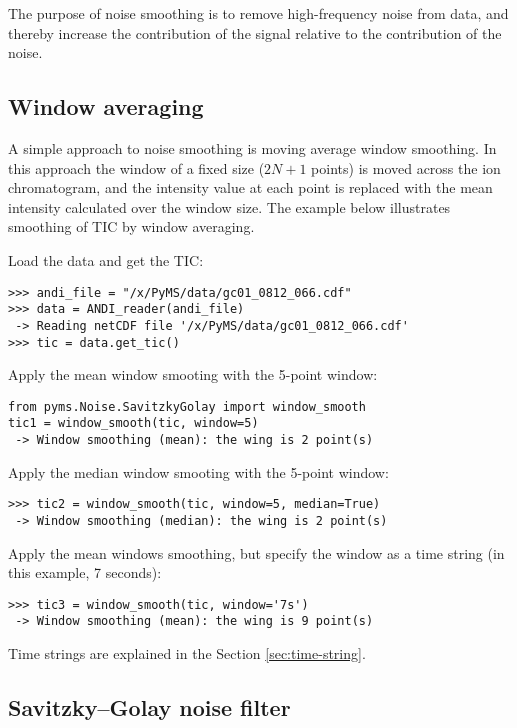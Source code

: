The purpose of noise smoothing is to remove high-frequency noise from
data, and thereby increase the contribution of the signal relative to
the contribution of the noise.

\subsection{Window averaging}


A simple approach to noise smoothing is moving average window smoothing.
In this approach the window of a fixed size ($2N+1$ points) is moved
across the ion chromatogram, and the intensity value at each point is
replaced with the mean intensity calculated over the window size.
The example below illustrates smoothing of TIC by window averaging.

Load the data and get the TIC:

\begin{verbatim}
>>> andi_file = "/x/PyMS/data/gc01_0812_066.cdf"
>>> data = ANDI_reader(andi_file)
 -> Reading netCDF file '/x/PyMS/data/gc01_0812_066.cdf'
>>> tic = data.get_tic()
\end{verbatim}

Apply the mean window smooting with the 5-point window:

\begin{verbatim}
from pyms.Noise.SavitzkyGolay import window_smooth
tic1 = window_smooth(tic, window=5)
 -> Window smoothing (mean): the wing is 2 point(s)
\end{verbatim}

Apply the median window smooting with the 5-point window:

\begin{verbatim}
>>> tic2 = window_smooth(tic, window=5, median=True)
 -> Window smoothing (median): the wing is 2 point(s)
\end{verbatim}

Apply the mean windows smoothing, but specify the window as
a time string (in this example, 7 seconds):

\begin{verbatim}
>>> tic3 = window_smooth(tic, window='7s')
 -> Window smoothing (mean): the wing is 9 point(s)
\end{verbatim}

Time strings are explained in the Section \ref{sec:time-string}.

\subsection{Savitzky--Golay noise filter}

